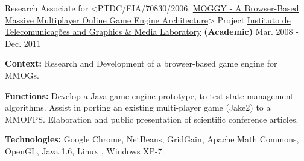 \begin{cventries}
  \cventry
    {Research Associate for <PTDC/EIA/70830/2006, \href{http://www.di.ubi.pt/~agomes/moggy/index.html}{MOGGY - A Browser-Based Massive Multiplayer Online Game Engine Architecture}> Project} %
    {\href{http://www.it.ubi.pt/medialab}{Instituto de Telecomunica\c{c}\~{o}es and Graphics \& Media Laboratory} \textbf{(Academic)}} %
    {} %
    {Mar. 2008 - Dec. 2011} %
    {
      \begin{cvitems} %
		\item[] {\textbf{Context:} Research and Development of a browser-based game engine for MMOGs.}
		\item[] {\textbf{Functions:} Develop a Java game engine prototype, to test state management algorithms. Assist in porting an existing multi-player game (Jake2) to a MMOFPS.%
Elaboration and public presentation of scientific conference articles.
		}
		\item[] {\textbf{Technologies:} 
		\textcolor{rainbowcolor-olive}{Google Chrome}, 
		\textcolor{rainbowcolor-olive}{NetBeans}, 
		\textcolor{rainbowcolor-indigo}{GridGain}, 
		\textcolor{rainbowcolor-indigo}{Apache Math Commons},
		\textcolor{rainbowcolor-indigo}{OpenGL}, 
		\textcolor{rainbowcolor-indigo}{Java 1.6}, 
		\textcolor{rainbowcolor-orange}{Linux%
        }, 
		\textcolor{rainbowcolor-orange}{Windows XP-7}.}
      \end{cvitems}
    }     
    

\end{cventries}

